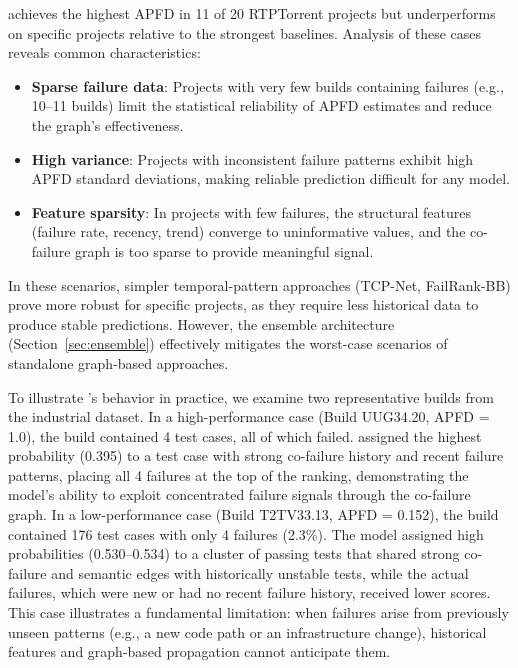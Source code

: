 \filopriori{} achieves the highest APFD in 11 of 20 RTPTorrent projects but
underperforms on specific projects relative to the strongest baselines.
Analysis of these cases reveals common characteristics:

\begin{itemize}
    \item \textbf{Sparse failure data}: Projects with very few builds
    containing failures (e.g., 10--11 builds) limit the
    statistical reliability of APFD estimates and reduce the graph's
    effectiveness.
    \item \textbf{High variance}: Projects with inconsistent failure patterns
    exhibit high APFD standard deviations, making reliable prediction
    difficult for any model.
    \item \textbf{Feature sparsity}: In projects with few failures, the
    structural features (failure rate, recency, trend) converge to uninformative
    values, and the co-failure graph is too sparse to provide meaningful signal.
\end{itemize}

In these scenarios, simpler temporal-pattern approaches (TCP-Net, FailRank-BB)
prove more robust for specific projects, as they require less historical data to produce stable
predictions. However, the ensemble
architecture (Section~\ref{sec:ensemble}) effectively mitigates the
worst-case scenarios of standalone graph-based approaches.

To illustrate \filopriori{}'s behavior in practice, we examine two
representative builds from the industrial dataset.
In a high-performance case (Build UUG34.20, APFD = 1.0),
the build contained 4 test cases, all of which failed. \filopriori{} assigned the
highest probability (0.395) to a test case with strong co-failure history
and recent failure patterns, placing all 4 failures at the top of the
ranking, demonstrating the model's ability to exploit
concentrated failure signals through the co-failure graph.
In a low-performance case (Build T2TV33.13, APFD = 0.152),
the build contained 176 test cases with only 4 failures (2.3\%). The model assigned
high probabilities (0.530--0.534) to a cluster of passing tests that shared
strong co-failure and semantic edges with historically unstable tests, while
the actual failures, which were new or had no recent failure history, received
lower scores. This case illustrates a fundamental limitation: when failures
arise from previously unseen patterns (e.g., a new code path or an
infrastructure change), historical features and graph-based propagation
cannot anticipate them.

